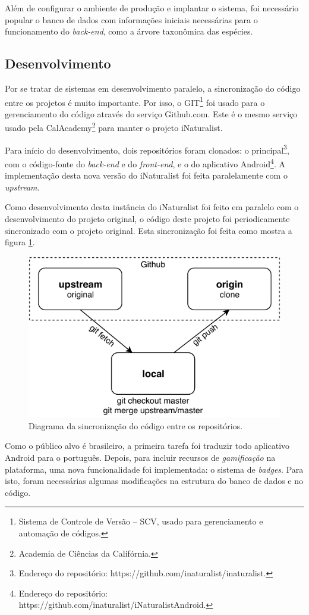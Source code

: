 Além de configurar o ambiente de produção e implantar o sistema, foi necessário popular o banco de dados com informações iniciais necessárias para o funcionamento do \emph{back-end}, como a árvore taxonômica das espécies.

\subsection{Desenvolvimento}
Por se tratar de sistemas em desenvolvimento paralelo, a sincronização do código entre os projetos é muito importante. Por isso, o GIT\footnote{Sistema de Controle de Versão -- SCV, usado para gerenciamento e automação de códigos.} foi usado para o gerenciamento do código através do serviço Github.com. Este é o mesmo serviço usado pela CalAcademy\footnote{Academia de Ciências da Califórnia.} para manter o projeto iNaturalist.

Para início do desenvolvimento, dois repositórios foram clonados: o principal\footnote{Endereço do repositório: https://github.com/inaturalist/inaturalist.}, com o código-fonte do \emph{back-end} e do \emph{front-end}, e o do aplicativo Android\footnote{Endereço do repositório: https://github.com/inaturalist/iNaturalistAndroid.}. A implementação desta nova versão do iNaturalist foi feita paralelamente com o \emph{upstream}.

Como desenvolvimento desta instância do iNaturalist foi feito em paralelo com o desenvolvimento do projeto original, o código deste projeto foi periodicamente sincronizado com o projeto original. Esta sincronização foi feita como mostra a figura \ref{fig:git}.

\begin{figure}[h!]
  \centering
  \includegraphics[width=.6\textwidth]{figures/github_diagram.pdf}
  \caption{Diagrama da sincronização do código entre os repositórios.}
  \label{fig:git}
\end{figure}

Como o público alvo é brasileiro, a primeira tarefa foi traduzir todo aplicativo Android para o português. Depois, para incluir recursos de \emph{gamificação} na plataforma, uma nova funcionalidade foi implementada: o sistema de \emph{badges}. Para isto, foram necessárias algumas modificações na estrutura do banco de dados e no código.

